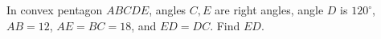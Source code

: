 In convex pentagon $ABCDE$, angles $C,E$ are right angles, angle $D$ is $120^\circ$, $AB=12$, $AE=BC=18$, and $ED=DC$. Find $ED$.
